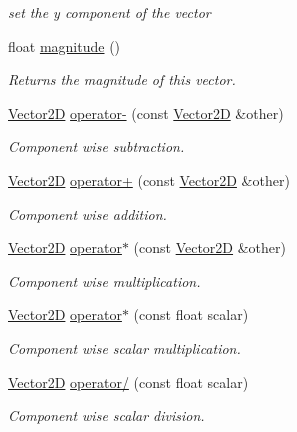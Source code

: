 \begin{DoxyCompactItemize}
\begin{DoxyCompactList}\small\item\em set the y component of the vector \end{DoxyCompactList}\item 
\hypertarget{class_vector2_d_a2840db6c516580a39fd5a309d991dae2}{float \hyperlink{class_vector2_d_a2840db6c516580a39fd5a309d991dae2}{magnitude} ()}\label{class_vector2_d_a2840db6c516580a39fd5a309d991dae2}

\begin{DoxyCompactList}\small\item\em Returns the magnitude of this vector. \end{DoxyCompactList}\item 
\hyperlink{class_vector2_d}{Vector2\-D} \hyperlink{class_vector2_d_a07a043fc63572c1cf3104ec0a9a4e796}{operator-\/} (const \hyperlink{class_vector2_d}{Vector2\-D} \&other)
\begin{DoxyCompactList}\small\item\em Component wise subtraction. \end{DoxyCompactList}\item 
\hyperlink{class_vector2_d}{Vector2\-D} \hyperlink{class_vector2_d_a2bed654f65df8c3bedbf8cd7d07071df}{operator+} (const \hyperlink{class_vector2_d}{Vector2\-D} \&other)
\begin{DoxyCompactList}\small\item\em Component wise addition. \end{DoxyCompactList}\item 
\hyperlink{class_vector2_d}{Vector2\-D} \hyperlink{class_vector2_d_a93aad0fe6040d4bde0c7dd3906f6cf90}{operator$\ast$} (const \hyperlink{class_vector2_d}{Vector2\-D} \&other)
\begin{DoxyCompactList}\small\item\em Component wise multiplication. \end{DoxyCompactList}\item 
\hyperlink{class_vector2_d}{Vector2\-D} \hyperlink{class_vector2_d_af509f754de79142227f10cdf7db52fb7}{operator$\ast$} (const float scalar)
\begin{DoxyCompactList}\small\item\em Component wise scalar multiplication. \end{DoxyCompactList}\item 
\hypertarget{class_vector2_d_a7e260b0a6fc69f2c4688a74c641bc68a}{\hyperlink{class_vector2_d}{Vector2\-D} \hyperlink{class_vector2_d_a7e260b0a6fc69f2c4688a74c641bc68a}{operator/} (const float scalar)}\label{class_vector2_d_a7e260b0a6fc69f2c4688a74c641bc68a}

\begin{DoxyCompactList}\small\item\em Component wise scalar division. \end{DoxyCompactList}\end{DoxyCompactItemize}
